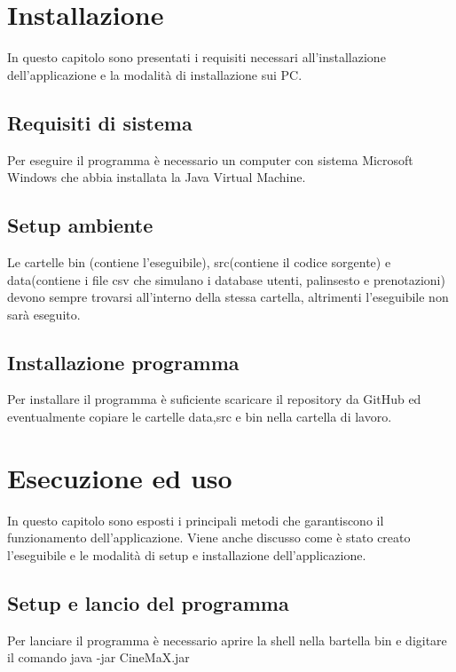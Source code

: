 \documentclass[a4paper,titlepage,openany,12pt]{book}
\begin{document}
\begin{frontespizio}

\end{frontespizio}
\tableofcontents

\chapter{Installazione}
In questo capitolo sono presentati i requisiti necessari all'installazione dell'applicazione e la modalità di installazione sui PC. 

\section{Requisiti di sistema}
Per eseguire il programma è necessario un computer con sistema Microsoft Windows che abbia installata la Java Virtual Machine.

\section{Setup ambiente}
Le cartelle bin (contiene l'eseguibile), src(contiene il codice sorgente) e data(contiene i file csv che simulano i database utenti, palinsesto e prenotazioni) devono sempre trovarsi all'interno della stessa cartella, altrimenti l'eseguibile non sarà eseguito.
\section{Installazione programma} 
Per installare il programma è suficiente scaricare il repository da GitHub ed eventualmente copiare le cartelle data,src e bin nella cartella di lavoro.
\chapter{Esecuzione ed uso}
In questo capitolo sono esposti i principali metodi che garantiscono il funzionamento dell'applicazione.
Viene anche discusso come è stato creato l'eseguibile e le modalità di setup e installazione dell'applicazione.

\section{Setup e lancio del programma}
Per lanciare il programma è necessario aprire la shell nella bartella bin e digitare il comando java -jar CineMaX.jar
\end{document}
